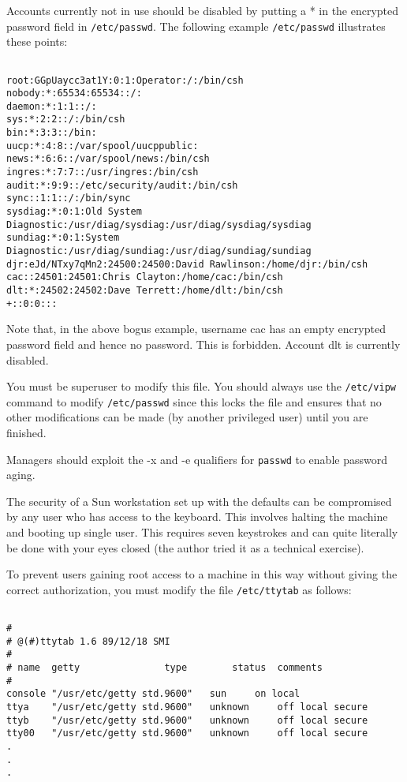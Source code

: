 Accounts currently not in use should be disabled by putting a * in the
encrypted password field in {\tt /etc/passwd}. The following example 
{\tt /etc/passwd}
illustrates these points:

\begin{verbatim}

root:GGpUaycc3at1Y:0:1:Operator:/:/bin/csh
nobody:*:65534:65534::/:
daemon:*:1:1::/:
sys:*:2:2::/:/bin/csh
bin:*:3:3::/bin:
uucp:*:4:8::/var/spool/uucppublic:
news:*:6:6::/var/spool/news:/bin/csh
ingres:*:7:7::/usr/ingres:/bin/csh
audit:*:9:9::/etc/security/audit:/bin/csh
sync::1:1::/:/bin/sync
sysdiag:*:0:1:Old System Diagnostic:/usr/diag/sysdiag:/usr/diag/sysdiag/sysdiag
sundiag:*:0:1:System Diagnostic:/usr/diag/sundiag:/usr/diag/sundiag/sundiag
djr:eJd/NTxy7qMn2:24500:24500:David Rawlinson:/home/djr:/bin/csh
cac::24501:24501:Chris Clayton:/home/cac:/bin/csh
dlt:*:24502:24502:Dave Terrett:/home/dlt:/bin/csh
+::0:0:::

\end{verbatim}

Note that, in the above bogus example, username cac has an empty encrypted
password field and hence no password. This is forbidden. Account dlt is
currently disabled.

You must be superuser to modify this file. You should always use the 
{\tt /etc/vipw} command to modify {\tt /etc/passwd} since this locks the file and 
ensures that no other modifications can be made (by another privileged
user) until you are finished. 

Managers should exploit the -x and -e qualifiers for {\tt passwd} to enable 
password aging. 

The security of a Sun workstation set up with the defaults can be compromised by any
user who has access to the keyboard. This involves halting the  machine and
booting up single user. This requires seven keystrokes and can quite literally
be done with your eyes closed (the author tried it as a technical exercise).

To prevent users gaining root access to a machine in this way without 
giving the correct authorization, you must modify the file {\tt /etc/ttytab} as
follows:

\begin{verbatim}

#
# @(#)ttytab 1.6 89/12/18 SMI
#
# name	getty				type		status	comments
#
console	"/usr/etc/getty std.9600"	sun		on local 
ttya	"/usr/etc/getty std.9600"	unknown		off local secure
ttyb	"/usr/etc/getty std.9600"	unknown		off local secure
tty00	"/usr/etc/getty std.9600"	unknown		off local secure
.
.
.

\end{verbatim}

